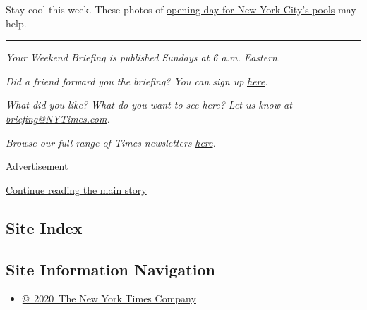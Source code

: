 Stay cool this week. These photos of
\href{https://www.nytimes3xbfgragh.onion/2020/07/24/nyregion/nyc-pools-open.html}{opening
day for New York City's pools} may help.

\begin{center}\rule{0.5\linewidth}{\linethickness}\end{center}

\emph{Your Weekend Briefing is published Sundays at 6 a.m. Eastern.}

\emph{Did a friend forward you the briefing? You can sign up}
\href{https://www.nytimes3xbfgragh.onion/newsletters/morning-briefing}{\emph{here}}\emph{.}

\emph{What did you like? What do you want to see here? Let us know at}
\href{mailto:briefing@NYTimes.com?subject=Weekend\%20Briefing\%20Feedback}{\emph{briefing@NYTimes.com}}\emph{.}

\emph{Browse our full range of Times newsletters}
\href{https://www.nytimes3xbfgragh.onion/newsletters}{\emph{here}}\emph{.}

Advertisement

\protect\hyperlink{after-bottom}{Continue reading the main story}

\hypertarget{site-index}{%
\subsection{Site Index}\label{site-index}}

\hypertarget{site-information-navigation}{%
\subsection{Site Information
Navigation}\label{site-information-navigation}}

\begin{itemize}
\tightlist
\item
  \href{https://help.nytimes3xbfgragh.onion/hc/en-us/articles/115014792127-Copyright-notice}{©~2020~The
  New York Times Company}
\end{itemize}


